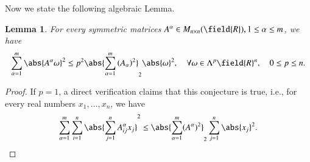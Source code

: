\documentclass[12pt]{amsart}
\theoremstyle{plain}
\newtheorem{lem}[lem]{Lemma}
\theoremstyle{remark}
\theoremstyle{definition}
\numberwithin{equation}{section}
\begin{document}
Now we state the following algebraic Lemma.
\begin{lem}\label{lem:algebraic-eriji}For every symmetric matrices $A^{\alpha}\in M_{n\times n}({\field{R}}), 1\leq\alpha\leq m$, we have
\begin{align*}
\sum_{\alpha=1}^m\abs{A^{\alpha}\omega}^2\leq p^2\abs{\sum_{\alpha=1}^m\left(A_{\alpha}\right)^2}_{2}\abs{\omega}^2,\quad\forall \omega\in\Lambda^p{\field{R}}^n, \quad 0\leq p\leq n.
\end{align*}
\end{lem}
\begin{proof} If $p=1$, a direct verification claims that this conjecture is true, i.e., for every real numbers $x_1,\dotsc, x_n$, we have
\begin{align*}
\sum_{\alpha=1}^m\sum_{i=1}^n\abs{\sum_{j=1}^nA^{\alpha}_{ij}x_j}^2\leq\abs{\sum_{\alpha=1}^m(A^{\alpha})^2}_2\sum_{j=1}^n\abs{x_j}^2.
\end{align*}


\end{proof}
\end{document}
